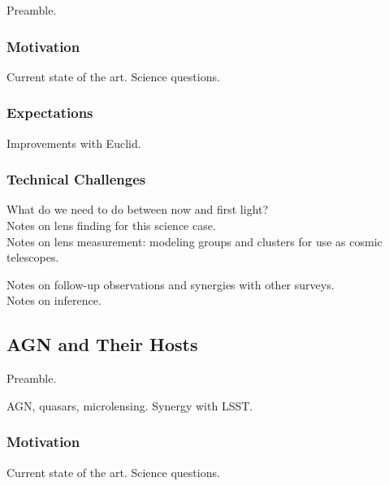 \documentclass[twocolumn]{svjour3}
\begin{document}


Preamble.

\subsubsection{Motivation}
Current state of the art. Science questions.\\

\subsubsection{Expectations}
Improvements with Euclid.\\

\subsubsection{Technical Challenges}

What do we need to do between now and first light?\\

Notes on lens finding for this science case.\\

Notes on lens measurement: modeling groups and clusters for use as
cosmic telescopes.

Notes on follow-up observations and synergies with other surveys.\\

Notes on inference.\\



\subsection{AGN and Their Hosts}



Preamble.

AGN, quasars, microlensing.
Synergy with LSST.

\subsubsection{Motivation}
Current state of the art. Science questions.\\
\end{document}
